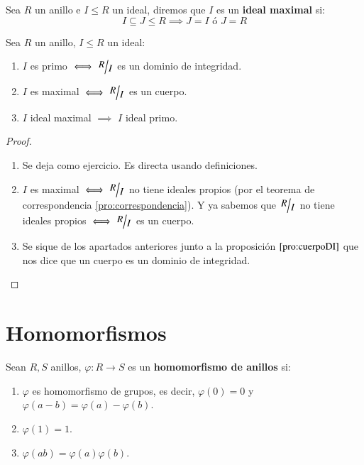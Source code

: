 \begin{dfn}
    Sea $R$ un anillo e $I \leq R$ un ideal, diremos que $I$ es un \textbf{ideal maximal} si:
    $$
        I \subseteq J \leq R \implies J = I \text { ó } J = R
    $$
\end{dfn}
\begin{thm}\label{thm:cocienteideales}
    Sea $R$ un anillo, $I \leq R$ un ideal:\\
    \begin{enumerate}
        \item $I$ es primo $\iff \quo{R}{I}$ es un dominio de integridad.
        \item $I$ es maximal $\iff \quo{R}{I}$ es un cuerpo.
        \item $I$ ideal maximal $\implies$ $I$ ideal primo.
    \end{enumerate}
\end{thm}
\begin{proof}$ $
    \begin{enumerate}
        \item Se deja como ejercicio. Es directa usando definiciones.
        \item $I$ es maximal $\iff \quo{R}{I}$ no tiene ideales propios (por el teorema de correspondencia \ref{pro:correspondencia}). Y ya sabemos que $\quo{R}{I}$ no tiene ideales propios $\iff \quo{R}{I}$ es un cuerpo.
        \item Se sique de los apartados anteriores junto a la proposición $\ref{pro:cuerpoDI}$ que nos dice que un cuerpo es un dominio de integridad.
    \end{enumerate}
\end{proof}

\section{Homomorfismos} \label{section:homomorfismos}

\begin{dfn}
    Sean $R, S$ anillos, $\varphi: R \to S$ es un \textbf{homomorfismo de anillos} si:\\
    \begin{enumerate}
        \item $\varphi$ es homomorfismo de grupos, es decir, $\varphi(0) = 0$ y $\varphi(a - b) = \varphi(a) - \varphi(b)$.
        \item $\varphi(1) = 1$.
        \item $\varphi(ab) = \varphi(a)\varphi(b)$.
    \end{enumerate}
\end{dfn}

